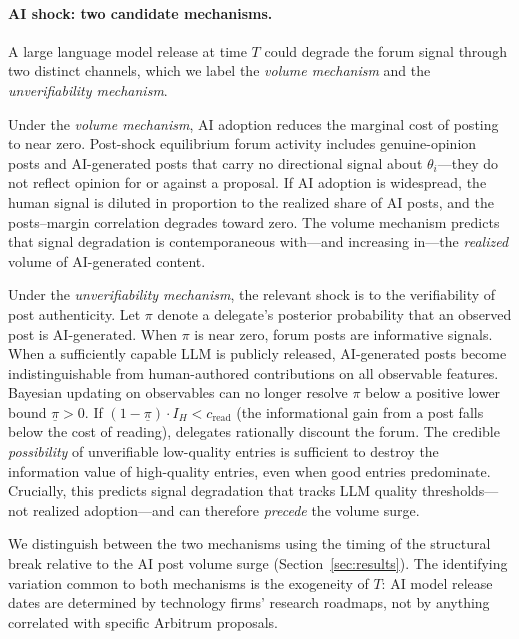 \documentclass[12pt]{article}
\begin{document}
\paragraph{AI shock: two candidate mechanisms.}
A large language model release at time $T$ could degrade the forum signal through
two distinct channels, which we label the \emph{volume mechanism} and the
\emph{unverifiability mechanism}.

Under the \emph{volume mechanism}, AI adoption reduces the marginal cost of posting
to near zero. Post-shock equilibrium forum activity includes genuine-opinion posts
and AI-generated posts that carry no directional signal about $\theta_i$---they do not reflect opinion for or against a proposal. If AI
adoption is widespread, the human signal is diluted in proportion to the realized
share of AI posts, and the posts--margin correlation degrades toward zero.
The volume mechanism predicts that signal degradation is contemporaneous with---and
increasing in---the \emph{realized} volume of AI-generated content.

Under the \emph{unverifiability mechanism}, the relevant shock is to the verifiability
of post authenticity. Let $\pi$ denote a delegate's posterior probability that an
observed post is AI-generated. When $\pi$ is near zero, forum posts are informative
signals. When a sufficiently capable LLM is publicly released, AI-generated posts
become indistinguishable from human-authored contributions on all observable features.
Bayesian updating on observables can no longer resolve $\pi$ below a positive lower
bound $\underline{\pi} > 0$. If $(1 - \underline{\pi}) \cdot I_H < c_{\text{read}}$
(the informational gain from a post falls below the cost of reading), delegates
rationally discount the forum. The credible \emph{possibility} of unverifiable
low-quality entries is sufficient to destroy the information value of high-quality
entries, even when good entries predominate. Crucially, this predicts signal
degradation that tracks LLM quality thresholds---not realized adoption---and can
therefore \emph{precede} the volume surge.

We distinguish between the two mechanisms using the timing of the structural break
relative to the AI post volume surge (Section~\ref{sec:results}). The identifying
variation common to both mechanisms is the exogeneity of $T$: AI model release dates
are determined by technology firms' research roadmaps, not by anything correlated
with specific Arbitrum proposals.

\end{document}
